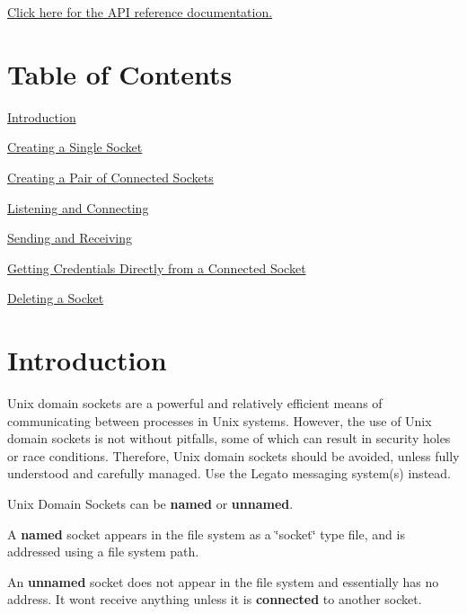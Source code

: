 \hyperlink{unix_socket_8h}{Click here for the A\+PI reference documentation.}



\hypertarget{c_unixSockets_toc}{}\section{Table of Contents}\label{c_unixSockets_toc}

\begin{DoxyItemize}
\item \hyperlink{c_unixSockets_c_unixSocketsIntro}{Introduction}
\item \hyperlink{c_unixSockets_c_unixSocketsCreatingSingle}{Creating a Single Socket}
\item \hyperlink{c_unixSockets_c_unixSocketsCreatingPair}{Creating a Pair of Connected Sockets}
\item \hyperlink{c_unixSockets_c_unixSocketsConnecting}{Listening and Connecting}
\item \hyperlink{c_unixSockets_c_unixSocketsSendingAndReceiving}{Sending and Receiving}
\item \hyperlink{c_unixSockets_c_unixSocketsGettingCredentialsDirect}{Getting Credentials Directly from a Connected Socket}
\item \hyperlink{c_unixSockets_c_unixSocketsDeleting}{Deleting a Socket}
\end{DoxyItemize}



\hypertarget{c_unixSockets_c_unixSocketsIntro}{}\section{Introduction}\label{c_unixSockets_c_unixSocketsIntro}
Unix domain sockets are a powerful and relatively efficient means of communicating between processes in Unix systems. However, the use of Unix domain sockets is not without pitfalls, some of which can result in security holes or race conditions. Therefore, Unix domain sockets should be avoided, unless fully understood and carefully managed. Use the Legato messaging system(s) instead.

Unix Domain Sockets can be {\bfseries named} or {\bfseries unnamed}.

A {\bfseries named} socket appears in the file system as a \char`\"{}socket\char`\"{} type file, and is addressed using a file system path.

An {\bfseries unnamed} socket does not appear in the file system and essentially has no address. It won\textquotesingle{}t receive anything unless it is {\bfseries connected} to another socket.

